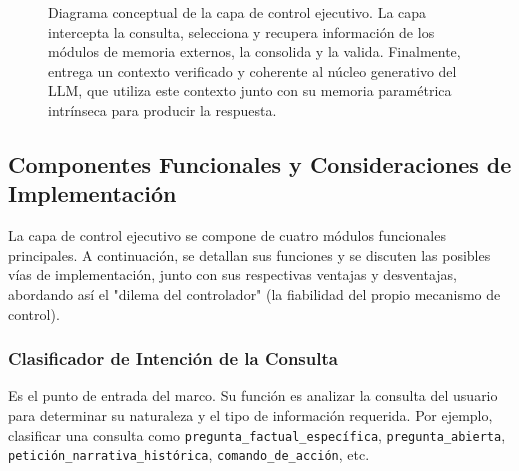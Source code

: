 \documentclass[journal,onecolumn]{IEEEtran}
\begin{document}
\begin{figure*}[ht]
\caption{Diagrama conceptual de la capa de control ejecutivo. La capa intercepta la consulta, selecciona y recupera información de los módulos de memoria externos, la consolida y la valida. Finalmente, entrega un contexto verificado y coherente al núcleo generativo del LLM, que utiliza este contexto junto con su memoria paramétrica intrínseca para producir la respuesta.}
\label{fig:arquitectura}
\end{figure*}

\subsection{Componentes Funcionales y Consideraciones de Implementación}
La capa de control ejecutivo se compone de cuatro módulos funcionales principales. A continuación, se detallan sus funciones y se discuten las posibles vías de implementación, junto con sus respectivas ventajas y desventajas, abordando así el "dilema del controlador" (la fiabilidad del propio mecanismo de control).

\subsubsection{Clasificador de Intención de la Consulta}
Es el punto de entrada del marco. Su función es analizar la consulta del usuario para determinar su naturaleza y el tipo de información requerida. Por ejemplo, clasificar una consulta como \texttt{pregunta\_factual\_específica}, \texttt{pregunta\_abierta}, \texttt{petición\_narrativa\_histórica}, \texttt{comando\_de\_acción}, etc.
\end{document}
